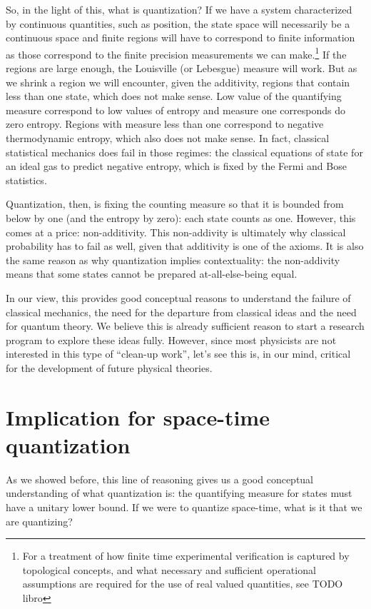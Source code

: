 \documentclass[10pt,twocolumn, nofootinbib]{revtex4-2}
\begin{document}
So, in the light of this, what is quantization? If we have a system characterized by continuous quantities, such as position, the state space will necessarily be a continuous space and finite regions will have to correspond to finite information as those correspond to the finite precision measurements we can make.\footnote{For a treatment of how finite time experimental verification is captured by topological concepts, and what necessary and sufficient operational assumptions are required for the use of real valued quantities, see TODO libro} If the regions are large enough, the Louisville (or Lebesgue) measure will work. But as we shrink a region we will encounter, given the additivity, regions that contain less than one state, which does not make sense. Low value of the quantifying measure correspond to low values of entropy and measure one corresponds do zero entropy. Regions with measure less than one correspond to negative thermodynamic entropy, which also does not make sense. In fact, classical statistical mechanics does fail in those regimes: the classical equations of state for an ideal gas to predict negative entropy, which is fixed by the Fermi and Bose statistics.

Quantization, then, is fixing the counting measure so that it is bounded from below by one (and the entropy by zero): each state counts as one. However, this comes at a price: non-additivity. This non-addivity is ultimately why classical probability has to fail as well, given that additivity is one of the axioms. It is also the same reason as why quantization implies contextuality: the non-addivity means that some states cannot be prepared at-all-else-being equal.

In our view, this provides good conceptual reasons to understand the failure of classical mechanics, the need for the departure from classical ideas and the need for quantum theory. We believe this is already sufficient reason to start a research program to explore these ideas fully. However, since most physicists are not interested in this type of ``clean-up work'', let's see this is, in our mind, critical for the development of future physical theories.

\section{Implication for space-time quantization}

As we showed before, this line of reasoning gives us a good conceptual understanding of what quantization is: the quantifying measure for states must have a unitary lower bound. If we were to quantize space-time, what is it that we are quantizing?
\end{document}
